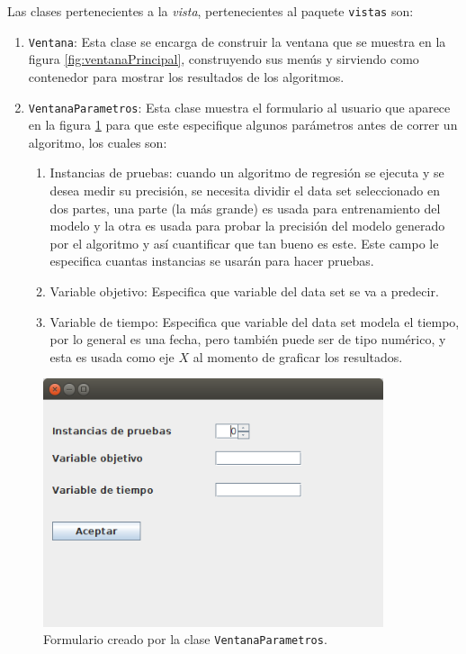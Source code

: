 Las clases pertenecientes a la \textit{vista}, pertenecientes al paquete \texttt{vistas} son:

\renewcommand{\labelenumi}{$\bullet$ }
\begin{enumerate}
	\item \texttt{Ventana}: Esta clase se encarga de construir la ventana que se muestra en la figura \ref{fig:ventanaPrincipal}, construyendo sus menús y sirviendo como contenedor para mostrar los resultados de los algoritmos.
	
	\item \texttt{VentanaParametros}: Esta clase muestra el formulario al usuario que aparece en la figura \ref{fig:VentanaParametros} para que este especifique algunos parámetros antes de correr un algoritmo, los cuales son:
	
	 \begin{enumerate}
	 	\item Instancias de pruebas: cuando un algoritmo de regresión se ejecuta y se desea medir su precisión, se necesita dividir el data set seleccionado en dos partes, una parte (la más grande) es usada para entrenamiento del modelo y la otra es usada para probar la precisión del modelo generado por el algoritmo y así cuantificar que tan bueno es este. Este campo le especifica cuantas instancias se usarán para hacer pruebas.

	 	\item Variable objetivo: Especifica que variable del data set se va a predecir.

	 	\item Variable de tiempo: Especifica que variable del data set modela el tiempo, por lo general es una fecha, pero también puede ser de tipo numérico, y esta es usada como eje $X$ al momento de graficar los resultados.
	 \end{enumerate} 

\end{enumerate}

\begin{figure}[ht]
	\centering
	\includegraphics[width=10cm]{img/VentanaParametros.png}
	\caption{Formulario creado por la clase \texttt{VentanaParametros}.}
	\label{fig:VentanaParametros}
\end{figure}

